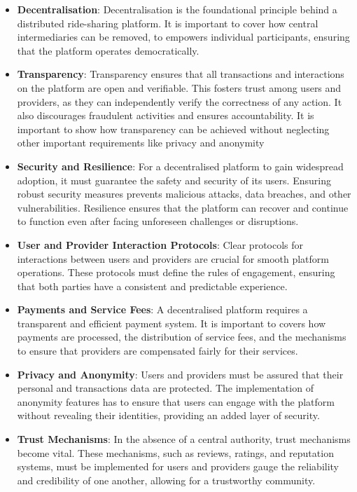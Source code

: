 \begin{itemize}
    \item \textbf{Decentralisation}: Decentralisation is the foundational principle behind a distributed ride-sharing platform. It is important to cover how central intermediaries can be removed, to empowers individual participants, ensuring that the platform operates democratically. 
    
    \item \textbf{Transparency}: Transparency ensures that all transactions and interactions on the platform are open and verifiable. This fosters trust among users and providers, as they can independently verify the correctness of any action. It also discourages fraudulent activities and ensures accountability. It is important to show how transparency can be achieved without neglecting other important requirements like privacy and anonymity 
    
    \item \textbf{Security and Resilience}: For a decentralised platform to gain widespread adoption, it must guarantee the safety and security of its users. Ensuring robust security measures prevents malicious attacks, data breaches, and other vulnerabilities. Resilience ensures that the platform can recover and continue to function even after facing unforeseen challenges or disruptions.
    
    \item \textbf{User and Provider Interaction Protocols}: Clear protocols for interactions between users and providers are crucial for smooth platform operations. These protocols must define the rules of engagement, ensuring that both parties have a consistent and predictable experience. 
    
    \item \textbf{Payments and Service Fees}: A decentralised platform requires a transparent and efficient payment system. It is important to covers how payments are processed, the distribution of service fees, and the mechanisms to ensure that providers are compensated fairly for their services.
    
    \item \textbf{Privacy and Anonymity}:  Users and providers must be assured that their personal and transactions data are protected. The implementation of anonymity features has to ensure that users can engage with the platform without revealing their identities, providing an added layer of security.
    
    \item \textbf{Trust Mechanisms}: In the absence of a central authority, trust mechanisms become vital. These mechanisms, such as reviews, ratings, and reputation systems, must be implemented for users and providers gauge the reliability and credibility of one another, allowing for a trustworthy community.
    

\end{itemize}
